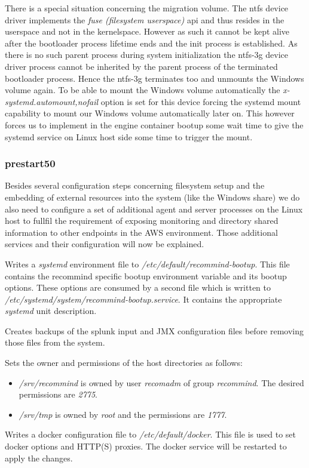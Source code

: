 \begin{description}
				There is a special situation concerning the migration volume. The ntfs device driver implements the \emph{fuse (filesystem userspace)} api and thus resides in the userspace and not in the kernelspace. However as such it cannot be kept alive after the bootloader process lifetime ends and the init process is established. As there is no such parent process during system initialization the ntfs-3g device driver process cannot be inherited by the parent process of the terminated bootloader process. Hence the ntfs-3g terminates too and unmounts the Windows volume again. To be able to mount the Windows volume automatically the \emph{x-systemd.automount,nofail} option is set for this device forcing the systemd mount capability to mount our Windows volume automatically later on. This however forces us to implement in the engine container bootup some wait time to give the systemd service on Linux host side some time to trigger the mount.
			\end{description}
			
			\subsubsection{prestart50}
			Besides several configuration steps concerning filesystem setup and the embedding of external resources into the system (like the Windows share) we do also need to configure a set of additional agent and server processes on the Linux host to fullfil the requirement of exposing monitoring and directory shared information to other endpoints in the AWS environment. Those additional services and their configuration will now be explained.
			\begin{description}\sloppy
				\item[systemd unit description installation] Writes a \emph{systemd} environment file to \emph{/etc/default/recommind-bootup}. This file contains the recommind specific bootup environment variable and its bootup options. These options are consumed by a second file which is written to \emph{/etc/systemd/system/recommind-bootup.service}. It contains the appropriate \emph{systemd} unit description.
				\item[splunk config removal] Creates backups of the splunk input and JMX configuration files before removing those files from the system.
				\item[Owner and permissions] Sets the owner and permissions of the host directories as follows:
				\begin{itemize}
					\item \emph{/srv/recommind} is owned by user \emph{recomadm} of group \emph{recommind}. The desired permissions are \emph{2775}.
					\item \emph{/srv/tmp} is owned by \emph{root} and the permissions are \emph{1777}.
				\end{itemize}
				\item[docker configuration update] Writes a docker configuration file to \emph{/etc/default/docker}. This file is used to set docker options and HTTP(S) proxies. The docker service will be restarted to apply the changes.
			\end{description}
			
